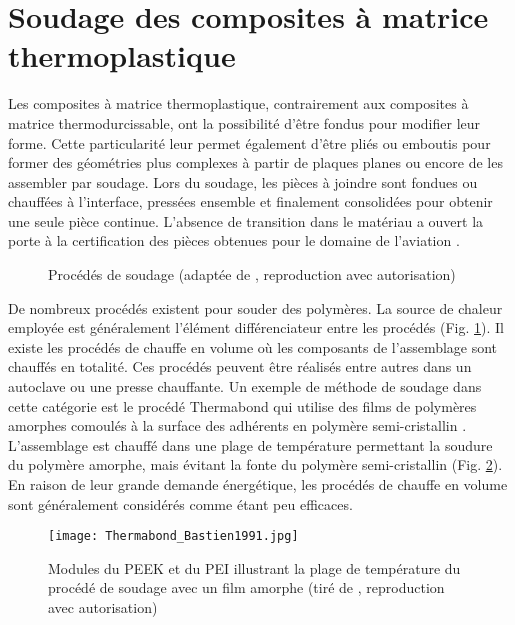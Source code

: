 \section{Soudage des composites à matrice thermoplastique}

Les composites à matrice thermoplastique, contrairement aux composites à matrice thermodurcissable, ont la possibilité d'être fondus pour modifier leur forme. 
Cette particularité leur permet également d'être pliés ou emboutis pour former des géométries plus complexes à partir de plaques planes ou encore de les assembler par soudage. 
Lors du soudage, les pièces à joindre sont fondues ou chauffées à l'interface, pressées ensemble et finalement consolidées pour obtenir une seule pièce continue. 
L'absence de transition dans le matériau a ouvert la porte à la certification des pièces obtenues pour le domaine de l'aviation \cite{Gardiner2018}. 

\begin{figure}[h]
	\centering
	\resizebox{0.75\textwidth}{!}{
		}
	\caption{Procédés de soudage (adaptée de \cite{Ageorges2001a}, reproduction avec autorisation)}
	\label{fig:arbre_procédé_soudage}
\end{figure}

\FloatBarrier
De nombreux procédés existent pour souder des polymères. 
La source de chaleur employée est généralement l'élément différenciateur entre les procédés (Fig. \ref{fig:arbre_procédé_soudage}). 
Il existe les procédés de chauffe en volume où les composants de l'assemblage sont chauffés en totalité. 
Ces procédés peuvent être réalisés entre autres dans un autoclave ou une presse chauffante. 
Un exemple de méthode de soudage dans cette catégorie est le procédé Thermabond qui utilise des films de polymères amorphes comoulés à la surface des adhérents en polymère semi-cristallin \cite{Smiley1991a}. 
L'assemblage est chauffé dans une plage de température permettant la soudure du polymère amorphe, mais évitant la fonte du polymère semi-cristallin (Fig. \ref{fig:thermabond_process}). 
En raison de leur grande demande énergétique, les procédés de chauffe en volume sont généralement considérés comme étant peu efficaces. 

\begin{figure}[h]
	\centering
	\texttt{[image: Thermabond\_Bastien1991.jpg]}
	\caption{Modules du PEEK et du PEI illustrant la plage de température du procédé de soudage avec un film amorphe (tiré de \cite{Bastien1991}, reproduction avec autorisation)}
	\label{fig:thermabond_process}
\end{figure}

